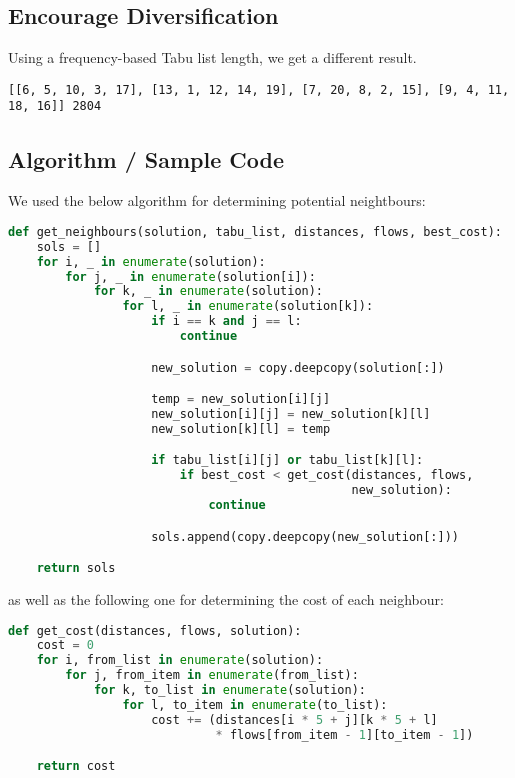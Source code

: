 \documentclass[12pt]{article}
\begin{document}
\subsection*{Encourage Diversification}
Using a frequency-based Tabu list length, we get a different result.
\begin{lstlisting}[breaklines=true]
[[6, 5, 10, 3, 17], [13, 1, 12, 14, 19], [7, 20, 8, 2, 15], [9, 4, 11, 18, 16]] 2804
\end{lstlisting}

\subsection*{Algorithm / Sample Code}
We used the below algorithm for determining potential neightbours:
\begin{lstlisting}[breaklines=true,language=python]
def get_neighbours(solution, tabu_list, distances, flows, best_cost):
    sols = []
    for i, _ in enumerate(solution):
        for j, _ in enumerate(solution[i]):
            for k, _ in enumerate(solution):
                for l, _ in enumerate(solution[k]):
                    if i == k and j == l:
                        continue

                    new_solution = copy.deepcopy(solution[:])

                    temp = new_solution[i][j]
                    new_solution[i][j] = new_solution[k][l]
                    new_solution[k][l] = temp

                    if tabu_list[i][j] or tabu_list[k][l]:
                        if best_cost < get_cost(distances, flows,
                                                new_solution):
                            continue

                    sols.append(copy.deepcopy(new_solution[:]))

    return sols
\end{lstlisting}

as well as the following one for determining the cost of each neighbour:
\begin{lstlisting}[breaklines=true,language=python]
def get_cost(distances, flows, solution):
    cost = 0
    for i, from_list in enumerate(solution):
        for j, from_item in enumerate(from_list):
            for k, to_list in enumerate(solution):
                for l, to_item in enumerate(to_list):
                    cost += (distances[i * 5 + j][k * 5 + l]
                             * flows[from_item - 1][to_item - 1])

    return cost
\end{lstlisting}
\end{document}
